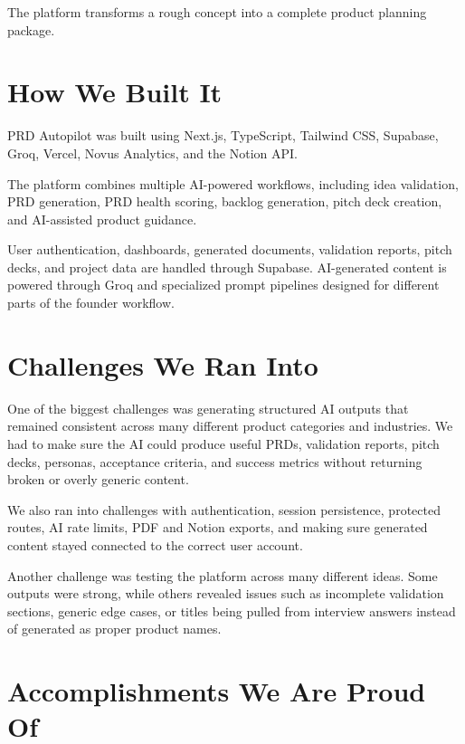 \documentclass[11pt]{article}
\begin{document}
The platform transforms a rough concept into a complete product planning package.

\section{How We Built It}

PRD Autopilot was built using Next.js, TypeScript, Tailwind CSS, Supabase, Groq, Vercel, Novus Analytics, and the Notion API.

The platform combines multiple AI-powered workflows, including idea validation, PRD generation, PRD health scoring, backlog generation, pitch deck creation, and AI-assisted product guidance.

User authentication, dashboards, generated documents, validation reports, pitch decks, and project data are handled through Supabase. AI-generated content is powered through Groq and specialized prompt pipelines designed for different parts of the founder workflow.

\section{Challenges We Ran Into}

One of the biggest challenges was generating structured AI outputs that remained consistent across many different product categories and industries. We had to make sure the AI could produce useful PRDs, validation reports, pitch decks, personas, acceptance criteria, and success metrics without returning broken or overly generic content.

We also ran into challenges with authentication, session persistence, protected routes, AI rate limits, PDF and Notion exports, and making sure generated content stayed connected to the correct user account.

Another challenge was testing the platform across many different ideas. Some outputs were strong, while others revealed issues such as incomplete validation sections, generic edge cases, or titles being pulled from interview answers instead of generated as proper product names.

\section{Accomplishments We Are Proud Of}
\end{document}
